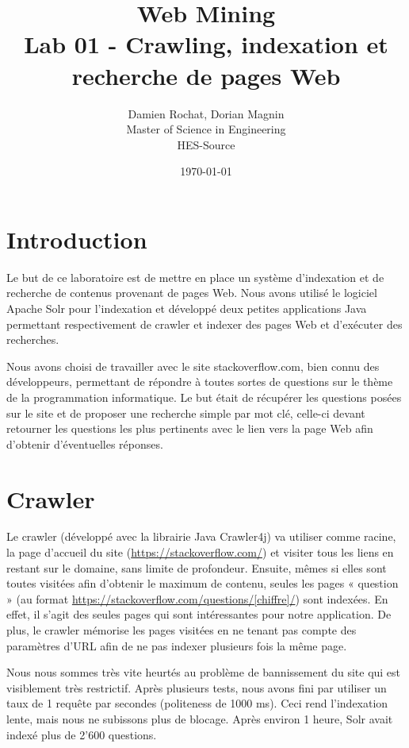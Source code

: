 \documentclass[a4paper]{article}
\title{
	Web Mining \\
	Lab 01 - Crawling, indexation et recherche de pages Web}
\author{
	Damien Rochat, Dorian Magnin \\
	Master of Science in Engineering \\
	HES-Source}
\date{\today}
\begin{document}
	\maketitle
	
	\section{Introduction}
	Le but de ce laboratoire est de mettre en place un système d'indexation et de recherche de contenus provenant de pages Web.
	Nous avons utilisé le logiciel Apache Solr pour l'indexation et développé deux petites applications Java permettant respectivement de crawler
	et indexer des pages Web et d'exécuter des recherches.

	Nous avons choisi de travailler avec le site stackoverflow.com, bien connu des développeurs,
	permettant de répondre à toutes sortes de questions sur le thème de la programmation informatique.
	Le but était de récupérer les questions posées sur le site et de proposer une recherche simple par mot clé,
	celle-ci devant retourner les questions les plus pertinents avec le lien vers la page Web afin d'obtenir d'éventuelles réponses.
	
	\section{Crawler}
	Le crawler (développé avec la librairie Java Crawler4j) va utiliser comme racine, la page d'accueil du site (\url{https://stackoverflow.com/})
	et visiter tous les liens en restant sur le domaine, sans limite de profondeur.
	Ensuite, mêmes si elles sont toutes visitées afin d'obtenir le maximum de contenu,
	seules les pages « question » (au format \url{https://stackoverflow.com/questions/[chiffre]/}) sont indexées.
	En effet, il s'agit des seules pages qui sont intéressantes pour notre application.
	De plus, le crawler mémorise les pages visitées en ne tenant pas compte des paramètres d'URL afin de ne pas indexer plusieurs fois la même page.

	Nous nous sommes très vite heurtés au problème de bannissement du site qui est visiblement très restrictif.
	Après plusieurs tests, nous avons fini par utiliser un taux de 1 requête par secondes (politeness de 1000 ms).
	Ceci rend l'indexation lente, mais nous ne subissons plus de blocage.
	Après environ 1 heure, Solr avait indexé plus de 2'600 questions.
\end{document}
